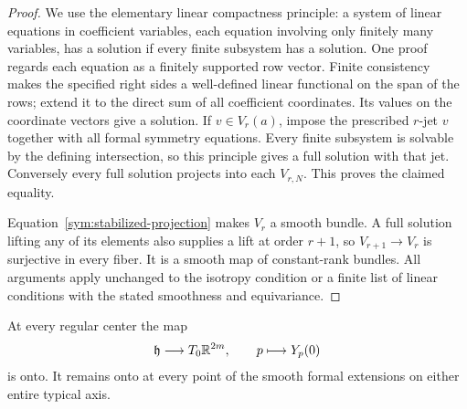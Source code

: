 \begin{proof}
We use the elementary linear compactness principle: a system of
linear equations in coefficient variables, each equation involving
only finitely many variables, has a solution if every finite
subsystem has a solution.  One proof regards each equation as a
finitely supported row vector.  Finite consistency makes the
specified right sides a well-defined linear functional on the span
of the rows; extend it to the direct sum of all coefficient
coordinates.  Its values on the coordinate vectors give a solution.
If $v\in V_r(a)$, impose the prescribed $r$-jet $v$ together with
all formal symmetry equations.  Every finite subsystem is solvable
by the defining intersection, so this principle gives a full
solution with that jet.  Conversely every full solution projects
into each $V_{r,N}$.  This proves the claimed equality.

Equation~\eqref{sym:stabilized-projection} makes $V_r$ a smooth
bundle.  A full solution lifting any of its elements also supplies
a lift at order $r+1$, so $V_{r+1}\to V_r$ is surjective in every
fiber.  It is a smooth map of constant-rank bundles.  All arguments
apply unchanged to the isotropy condition or a finite list of
linear conditions with the stated smoothness and equivariance.
\end{proof}

\begin{proposition}[Transitivity]
\label{sym:transitivity}
At every regular center the map
\[
 \mathfrak h\longrightarrow T_0\mathbb R^{2m},\qquad p\longmapsto Y_p(0)
\]
is onto.  It remains onto at every point of the smooth formal
extensions on either entire typical axis.
\end{proposition}

